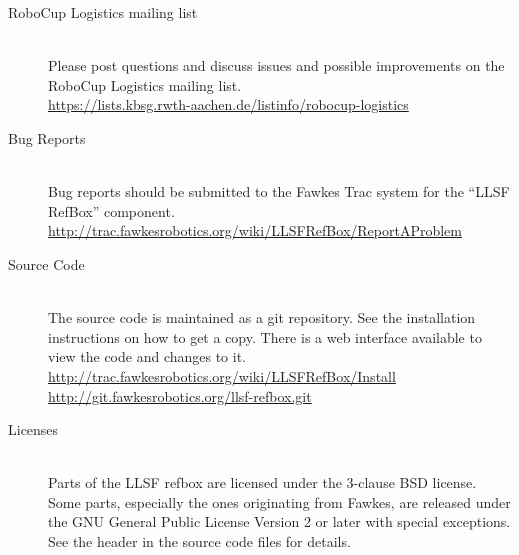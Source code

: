 \documentclass[a4paper]{article}
\begin{document}
\begin{description}
\item[RoboCup Logistics mailing list] \hfill\\
  Please post questions and discuss issues and possible improvements
  on the RoboCup Logistics mailing list.\\
  \url{https://lists.kbsg.rwth-aachen.de/listinfo/robocup-logistics}
\item[Bug Reports] \hfill\\
  Bug reports should be submitted to the Fawkes Trac system for the
  ``LLSF RefBox'' component.\\
  \url{http://trac.fawkesrobotics.org/wiki/LLSFRefBox/ReportAProblem}
\item[Source Code] \hfill\\
  The source code is maintained as a git repository. See the
  installation instructions on how to get a copy. There is a web
  interface available to view the code and changes to it.\\
  \url{http://trac.fawkesrobotics.org/wiki/LLSFRefBox/Install}\\
  \url{http://git.fawkesrobotics.org/llsf-refbox.git}
\item[Licenses] \hfill\\
  Parts of the LLSF refbox are licensed under the 3-clause BSD
  license. Some parts, especially the ones originating from Fawkes,
  are released under the GNU General Public License Version 2 or later
  with special exceptions. See the header in the source code files for
  details.
\end{description}

{\small


}
\end{document}
